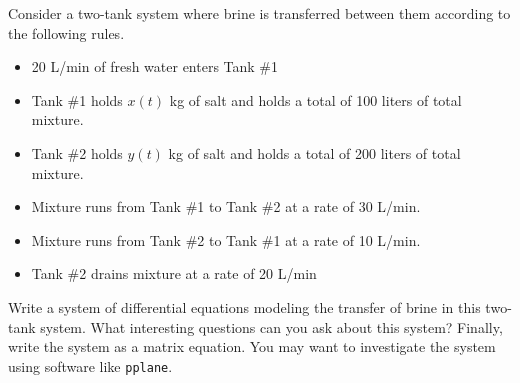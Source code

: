 \begin{problem}
    Consider a two-tank system where brine is transferred between them according to the
    following rules.
    \begin{itemize}
        \item 20 L/min of fresh water enters Tank \#1
        \item Tank \#1 holds $x(t)$ kg of salt and holds a total of 100 liters of total
            mixture.
        \item Tank \#2 holds $y(t)$ kg of salt and holds a total of 200 liters of total
            mixture.
        \item Mixture runs from Tank \#1 to Tank \#2 at a rate of 30 L/min.
        \item Mixture runs from Tank \#2 to Tank \#1 at a rate of 10 L/min.
        \item Tank \#2 drains mixture at a rate of 20 L/min
    \end{itemize}
    Write a system of differential equations modeling the transfer of brine in this
    two-tank system.  What interesting questions can you ask about this system?  Finally,
    write the system as a matrix equation. You may want to investigate the system using
    software like \texttt{pplane}.
\end{problem}



